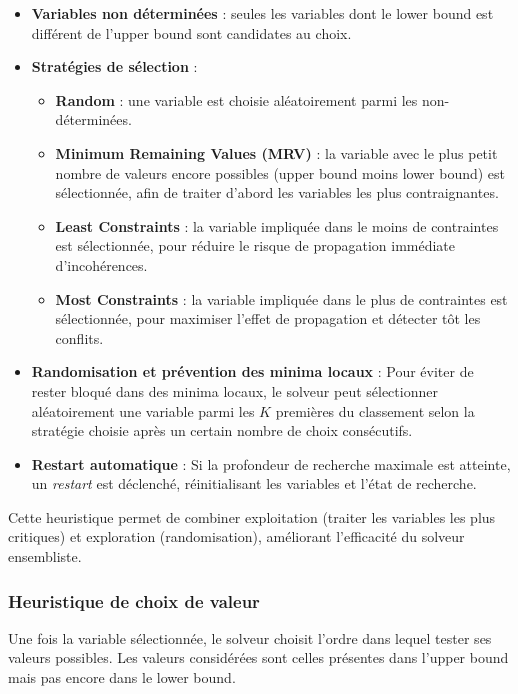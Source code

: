 \documentclass{article}
\begin{document}
\begin{itemize}
    \item \textbf{Variables non déterminées} : seules les variables dont le lower bound est différent de l'upper bound sont candidates au choix.

    \item \textbf{Stratégies de sélection} :
    \begin{itemize}
        \item \textbf{Random} : une variable est choisie aléatoirement parmi les non-déterminées.
        \item \textbf{Minimum Remaining Values (MRV)} : la variable avec le plus petit nombre de valeurs encore possibles (upper bound moins lower bound) est sélectionnée, afin de traiter d'abord les variables les plus contraignantes.
        \item \textbf{Least Constraints} : la variable impliquée dans le moins de contraintes est sélectionnée, pour réduire le risque de propagation immédiate d'incohérences.
        \item \textbf{Most Constraints} : la variable impliquée dans le plus de contraintes est sélectionnée, pour maximiser l'effet de propagation et détecter tôt les conflits.
    \end{itemize}

    \item \textbf{Randomisation et prévention des minima locaux} :
    Pour éviter de rester bloqué dans des minima locaux, le solveur peut sélectionner aléatoirement une variable parmi les $K$ premières du classement selon la stratégie choisie après un certain nombre de choix consécutifs.

    \item \textbf{Restart automatique} :
    Si la profondeur de recherche maximale est atteinte, un \emph{restart} est déclenché, réinitialisant les variables et l'état de recherche.
\end{itemize}

Cette heuristique permet de combiner exploitation (traiter les variables les plus critiques) et exploration (randomisation), améliorant l'efficacité du solveur ensembliste.




\subsubsection{Heuristique de choix de valeur}

Une fois la variable sélectionnée, le solveur choisit l'ordre dans lequel tester ses valeurs possibles. 
Les valeurs considérées sont celles présentes dans l'upper bound mais pas encore dans le lower bound.
\end{document}
